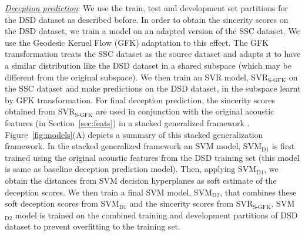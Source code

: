 \documentclass{article}
\begin{document}
\begin{spacing}{0.89}
\underline{\it Deception prediction}: 
We use the train, test and development set partitions for the DSD dataset as described before.
In order to obtain the sincerity scores on the DSD dataset, we train a model on an adapted version of the SSC dataset.
We use the Geodesic Kernel Flow (GFK) adaptation \cite{gong2012geodesic} to this effect.
The GFK transformation treats the SSC dataset as the source dataset and adapts it to have a similar distribution like the DSD dataset in a shared subspace (which may be different from the original subspace). 
We then train an SVR model, SVR$_\text{S-GFK}$ on the SSC dataset and make predictions on the DSD dataset, in the subspace learnt by GFK transformation.
For final deception prediction, the sincerity scores obtained from SVR$_\text{S-GFK}$ are used in conjunction with the original acoustic features (in Section~\ref{sec:feats}) in a stacked generalized framework \cite{wolpert1992stacked}.
Figure~\ref{fig:models}(A) depicts a summary of this stacked generalization framework.
In the stacked generalized framework an SVM model, SVM$_\text{D1}$ is first trained using the original acoustic features from the DSD training set (this model is same as baseline deception prediction model).
Then, applying SVM$_\text{D1}$, we obtain the distances from SVM decision hyperplanes as soft estimate of the deception scores. 
We then train a final SVM model, SVM$_\text{D2}$, that combines these soft deception scores from SVM$_\text{D1}$ and the sincerity scores from SVR$_\text{S-GFK}$.
SVM$_\text{D2}$ model is trained on the combined training and development partitions of DSD dataset to prevent overfitting to the training set. 




\end{spacing}
\end{document}
